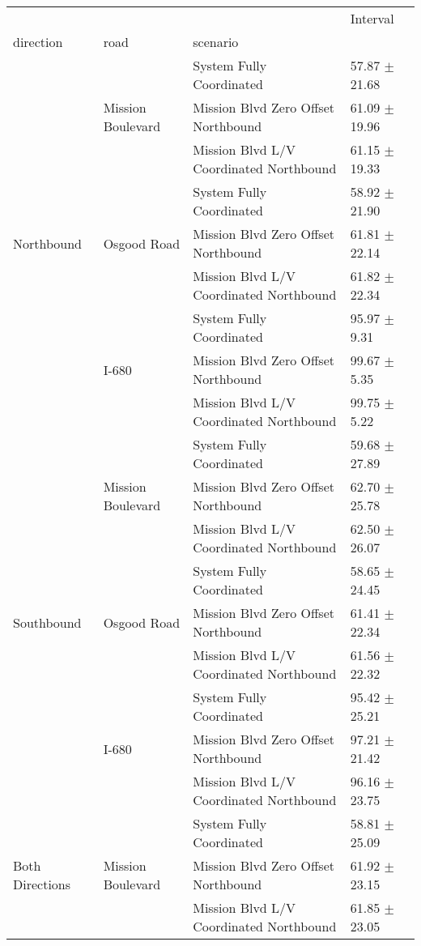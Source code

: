 \begin{tabular}{llll}
\toprule
 &  &  & Interval \\
direction & road & scenario &  \\
\midrule
\multirow[t]{9}{*}{Northbound} & \multirow[t]{3}{*}{Mission Boulevard} & System Fully Coordinated & 57.87 $\pm$ 21.68 \\
 &  & Mission Blvd Zero Offset Northbound & 61.09 $\pm$ 19.96 \\
 &  & Mission Blvd L/V Coordinated Northbound & 61.15 $\pm$ 19.33 \\
 & \multirow[t]{3}{*}{Osgood Road} & System Fully Coordinated & 58.92 $\pm$ 21.90 \\
 &  & Mission Blvd Zero Offset Northbound & 61.81 $\pm$ 22.14 \\
 &  & Mission Blvd L/V Coordinated Northbound & 61.82 $\pm$ 22.34 \\
 & \multirow[t]{3}{*}{I-680} & System Fully Coordinated & 95.97 $\pm$ 9.31 \\
 &  & Mission Blvd Zero Offset Northbound & 99.67 $\pm$ 5.35 \\
 &  & Mission Blvd L/V Coordinated Northbound & 99.75 $\pm$ 5.22 \\
\multirow[t]{9}{*}{Southbound} & \multirow[t]{3}{*}{Mission Boulevard} & System Fully Coordinated & 59.68 $\pm$ 27.89 \\
 &  & Mission Blvd Zero Offset Northbound & 62.70 $\pm$ 25.78 \\
 &  & Mission Blvd L/V Coordinated Northbound & 62.50 $\pm$ 26.07 \\
 & \multirow[t]{3}{*}{Osgood Road} & System Fully Coordinated & 58.65 $\pm$ 24.45 \\
 &  & Mission Blvd Zero Offset Northbound & 61.41 $\pm$ 22.34 \\
 &  & Mission Blvd L/V Coordinated Northbound & 61.56 $\pm$ 22.32 \\
 & \multirow[t]{3}{*}{I-680} & System Fully Coordinated & 95.42 $\pm$ 25.21 \\
 &  & Mission Blvd Zero Offset Northbound & 97.21 $\pm$ 21.42 \\
 &  & Mission Blvd L/V Coordinated Northbound & 96.16 $\pm$ 23.75 \\
\multirow[t]{9}{*}{Both Directions} & \multirow[t]{3}{*}{Mission Boulevard} & System Fully Coordinated & 58.81 $\pm$ 25.09 \\
 &  & Mission Blvd Zero Offset Northbound & 61.92 $\pm$ 23.15 \\
 &  & Mission Blvd L/V Coordinated Northbound & 61.85 $\pm$ 23.05 \\

\end{tabular}
